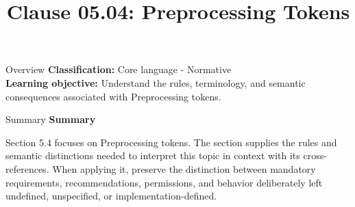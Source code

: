 \documentclass[10pt,letterpaper]{article}
\title{Clause 05.04: Preprocessing Tokens}
\author{}
\date{}
\begin{document}
\maketitle
\begin{CornellOverviewBox}{Overview}
\textbf{Classification:} Core language - Normative\\[2pt]
\textbf{Learning objective:} Understand the rules, terminology, and semantic consequences associated with Preprocessing tokens.
\end{CornellOverviewBox}\begin{CornellSummaryBox}{Summary}
{\sffamily\bfseries\color{Accent} Summary}\par\vspace{3pt}Section 5.4 focuses on Preprocessing tokens. The section supplies the rules and semantic distinctions needed to interpret this topic in context with its cross-references. When applying it, preserve the distinction between mandatory requirements, recommendations, permissions, and behavior deliberately left undefined, unspecified, or implementation-defined.
\end{CornellSummaryBox}
\end{document}

